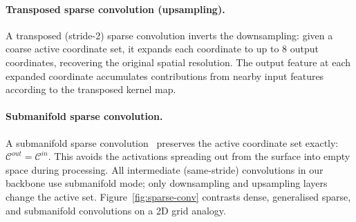 \paragraph{Transposed sparse convolution (upsampling).}
A transposed (stride-2) sparse convolution inverts the downsampling:
given a coarse active coordinate set, it expands each coordinate to up to 8
output coordinates, recovering the original spatial resolution.
The output feature at each expanded coordinate accumulates contributions from
nearby input features according to the transposed kernel map.

\paragraph{Submanifold sparse convolution.}
A submanifold sparse convolution~\cite{graham20183d} preserves the active
coordinate set exactly: $\mathcal{C}^{out} = \mathcal{C}^{in}$.
This avoids the activations spreading out from the surface into empty space
during processing.
All intermediate (same-stride) convolutions in our backbone use submanifold
mode; only downsampling and upsampling layers change the active set.
Figure~\ref{fig:sparse-conv} contrasts dense, generalised sparse, and submanifold
convolutions on a 2D grid analogy.

